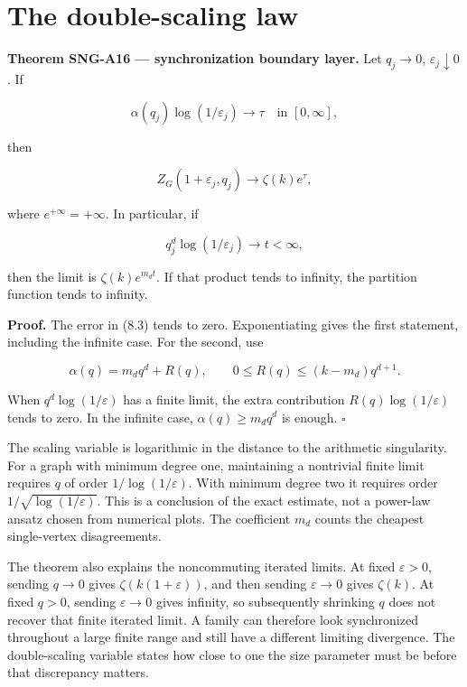 \documentclass[
  11pt,
  a4paper,
]{report}
\begin{document}
\hypertarget{the-double-scaling-law}{%
\section{The double-scaling law}\label{the-double-scaling-law}}

\textbf{Theorem SNG-A16 --- synchronization boundary layer.} Let
\(q_j\to0\), \(\varepsilon_j\downarrow0\). If

\[
 \alpha(q_j)\log(1/\varepsilon_j)\longrightarrow\tau
 \quad\text{in }[0,\infty],
\]

then

\[
 Z_G(1+\varepsilon_j,q_j)
 \longrightarrow\zeta(k)e^\tau,
 \tag{8.5}
\]

where \(e^{+\infty}=+\infty\). In particular, if

\[
 q_j^d\log(1/\varepsilon_j)\longrightarrow t<\infty,
\]

then the limit is \(\zeta(k)e^{m_dt}\). If that product tends to
infinity, the partition function tends to infinity.

\textbf{Proof.} The error in (8.3) tends to zero. Exponentiating gives
the first statement, including the infinite case. For the second, use

\[
 \alpha(q)=m_dq^d+R(q),\qquad
 0\le R(q)\le(k-m_d)q^{d+1}.
\]

When \(q^d\log(1/\varepsilon)\) has a finite limit, the extra
contribution \(R(q)\log(1/\varepsilon)\) tends to zero. In the infinite
case, \(\alpha(q)\ge m_dq^d\) is enough. \(\square\)

The scaling variable is logarithmic in the distance to the arithmetic
singularity. For a graph with minimum degree one, maintaining a
nontrivial finite limit requires \(q\) of order
\(1/\log(1/\varepsilon)\). With minimum degree two it requires order
\(1/\sqrt{\log(1/\varepsilon)}\). This is a conclusion of the exact
estimate, not a power-law ansatz chosen from numerical plots. The
coefficient \(m_d\) counts the cheapest single-vertex disagreements.

The theorem also explains the noncommuting iterated limits. At fixed
\(\varepsilon>0\), sending \(q\to0\) gives \(\zeta(k(1+\varepsilon))\),
and then sending \(\varepsilon\to0\) gives \(\zeta(k)\). At fixed
\(q>0\), sending \(\varepsilon\to0\) gives infinity, so subsequently
shrinking \(q\) does not recover that finite iterated limit. A family
can therefore look synchronized throughout a large finite range and
still have a different limiting divergence. The double-scaling variable
states how close to one the size parameter must be before that
discrepancy matters.
\end{document}
